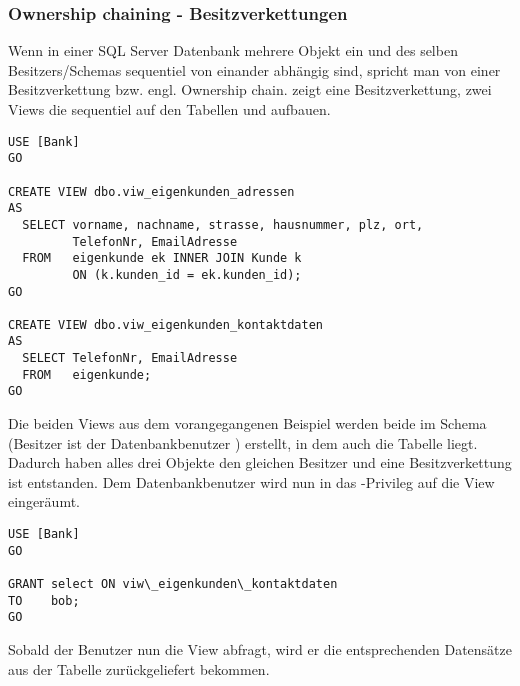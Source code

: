         \subsubsection{Ownership chaining - Besitzverkettungen}
          Wenn in einer SQL Server Datenbank mehrere Objekt ein und des selben
          Besitzers/Schemas sequentiel von einander abhängig sind, spricht man
          von einer Besitzverkettung bzw. engl. Ownership chain.
           zeigt eine Besitzverkettung, zwei Views die
          sequentiel auf den Tabellen  und
           aufbauen.
          \begin{lstlisting}[language=ms_sql,caption={Eine
          Besitzverkettung},label=sql19_23]
USE [Bank]
GO

CREATE VIEW dbo.viw_eigenkunden_adressen
AS
  SELECT vorname, nachname, strasse, hausnummer, plz, ort,
         TelefonNr, EmailAdresse
  FROM   eigenkunde ek INNER JOIN Kunde k 
         ON (k.kunden_id = ek.kunden_id);
GO

CREATE VIEW dbo.viw_eigenkunden_kontaktdaten
AS
  SELECT TelefonNr, EmailAdresse
  FROM   eigenkunde;
GO
          \end{lstlisting}
          Die beiden Views aus dem vorangegangenen Beispiel werden beide im
          Schema  (Besitzer ist der Datenbankbenutzer
          ) erstellt, in dem auch die Tabelle
           liegt. Dadurch haben alles drei Objekte den
          gleichen Besitzer und eine Besitzverkettung ist entstanden.
          Dem Datenbankbenutzer  wird nun in 
          das -Privileg auf die View
           eingeräumt.
          \begin{lstlisting}[language=ms_sql,caption={Bob
          erhält Leserechte},label=sql19_24]
USE [Bank]
GO

GRANT select ON viw\_eigenkunden\_kontaktdaten
TO    bob;
GO
          \end{lstlisting}
          Sobald der Benutzer  nun die View
           abfragt, wird er die
          entsprechenden Datensätze aus der Tabelle 
          zurückgeliefert bekommen.
          
